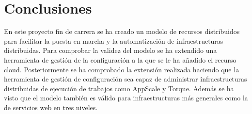 \chapter{Conclusiones}
\label{cap:conclusiones}


En este proyecto fin de carrera se ha creado un modelo de recursos distribuidos para facilitar la puesta en marcha y la automatización de infraestructuras distribuidas. Para comprobar la validez del modelo se ha extendido una herramienta de gestión de la configuración a la que se le ha añadido el recurso cloud. Posteriormente se ha comprobado la extensión realizada haciendo que la herramienta de gestión de configuración sea capaz de administrar infraestructuras distribuidas de ejecución de trabajos como AppScale y Torque. Además se ha visto que el modelo también es válido para infraestructuras más generales como la de servicios web en tres niveles.

